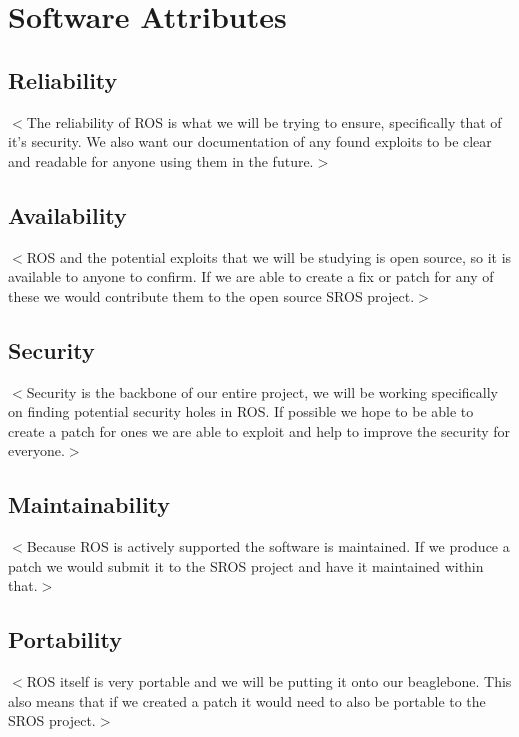\documentclass{scrreprt}
\begin{document}
\section{Software Attributes}
  \subsection{Reliability}
  $<$The reliability of ROS is what we will be trying to ensure, specifically that of it's security.
  We also want our documentation of any found exploits to be clear and readable for anyone using them in the future.$>$

  \subsection{Availability}
  $<$ROS and the potential exploits that we will be studying is open source, so it is available to anyone to confirm.
  If we are able to create a fix or patch for any of these we would contribute them to the open source SROS project.$>$

  \subsection{Security}
  $<$Security is the backbone of our entire project, we will be working specifically on finding potential security holes in ROS.
  If possible we hope to be able to create a patch for ones we are able to exploit and help to improve the security for everyone.$>$

  \subsection{Maintainability}
  $<$Because ROS is actively supported the software is maintained.
  If we produce a patch we would submit it to the SROS project and have it maintained within that.$>$

  \subsection{Portability}
  $<$ROS itself is very portable and we will be putting it onto our beaglebone.
  This also means that if we created a patch it would need to also be portable to the SROS project.$>$
\end{document}
